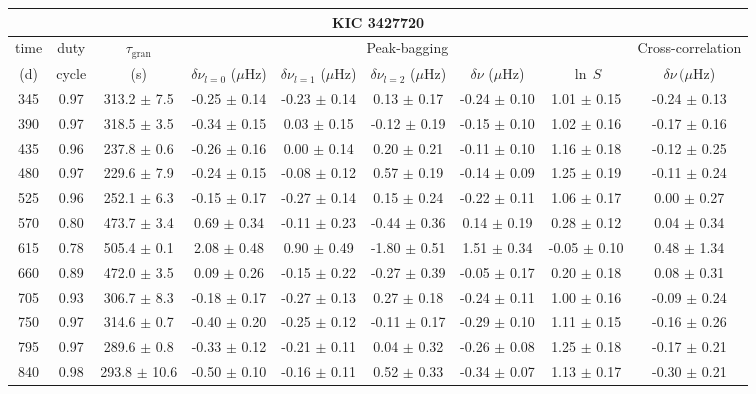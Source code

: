 \documentclass[twocolumn]{aastex61}%
\begin{document}
\begin{table*}[ht]\centering\fontsize{9.}{7.}\selectfont
\begin{tabular}{ccc|ccccc|c}
\multicolumn{9}{c}{KIC 3427720}\\ \hline\hline
time & duty & $\tau_\text{gran}$ &\multicolumn{5}{c|}{Peak-bagging}&Cross-correlation\\
(d)& cycle & (s)&$\delta\nu_{l=0}$ ($\mu$Hz) & $\delta\nu_{l=1}$ ($\mu$Hz) & $\delta\nu_{l=2}$ ($\mu$Hz) & $\delta\nu$ ($\mu$Hz)& $\ln\,S$ & $\delta\nu\,(\mu$Hz)\\\hline
345 & 0.97 & 313.2 $\pm$ 7.5 & -0.25 $\pm$ 0.14 & -0.23 $\pm$ 0.14 & 0.13 $\pm$ 0.17 & -0.24 $\pm$ 0.10 & 1.01 $\pm$ 0.15 & -0.24 $\pm$ 0.13\\
390 & 0.97 & 318.5 $\pm$ 3.5 & -0.34 $\pm$ 0.15 & 0.03 $\pm$ 0.15 & -0.12 $\pm$ 0.19 & -0.15 $\pm$ 0.10 & 1.02 $\pm$ 0.16 & -0.17 $\pm$ 0.16\\
435 & 0.96 & 237.8 $\pm$ 0.6 & -0.26 $\pm$ 0.16 & 0.00 $\pm$ 0.14 & 0.20 $\pm$ 0.21 & -0.11 $\pm$ 0.10 & 1.16 $\pm$ 0.18 & -0.12 $\pm$ 0.25\\
480 & 0.97 & 229.6 $\pm$ 7.9 & -0.24 $\pm$ 0.15 & -0.08 $\pm$ 0.12 & 0.57 $\pm$ 0.19 & -0.14 $\pm$ 0.09 & 1.25 $\pm$ 0.19 & -0.11 $\pm$ 0.24\\
525 & 0.96 & 252.1 $\pm$ 6.3 & -0.15 $\pm$ 0.17 & -0.27 $\pm$ 0.14 & 0.15 $\pm$ 0.24 & -0.22 $\pm$ 0.11 & 1.06 $\pm$ 0.17 & 0.00 $\pm$ 0.27\\
570 & 0.80 & 473.7 $\pm$ 3.4 & 0.69 $\pm$ 0.34 & -0.11 $\pm$ 0.23 & -0.44 $\pm$ 0.36 & 0.14 $\pm$ 0.19 & 0.28 $\pm$ 0.12 & 0.04 $\pm$ 0.34\\
615 & 0.78 & 505.4 $\pm$ 0.1 & 2.08 $\pm$ 0.48 & 0.90 $\pm$ 0.49 & -1.80 $\pm$ 0.51 & 1.51 $\pm$ 0.34 & -0.05 $\pm$ 0.10 & 0.48 $\pm$ 1.34\\
660 & 0.89 & 472.0 $\pm$ 3.5 & 0.09 $\pm$ 0.26 & -0.15 $\pm$ 0.22 & -0.27 $\pm$ 0.39 & -0.05 $\pm$ 0.17 & 0.20 $\pm$ 0.18 & 0.08 $\pm$ 0.31\\
705 & 0.93 & 306.7 $\pm$ 8.3 & -0.18 $\pm$ 0.17 & -0.27 $\pm$ 0.13 & 0.27 $\pm$ 0.18 & -0.24 $\pm$ 0.11 & 1.00 $\pm$ 0.16 & -0.09 $\pm$ 0.24\\
750 & 0.97 & 314.6 $\pm$ 0.7 & -0.40 $\pm$ 0.20 & -0.25 $\pm$ 0.12 & -0.11 $\pm$ 0.17 & -0.29 $\pm$ 0.10 & 1.11 $\pm$ 0.15 & -0.16 $\pm$ 0.26\\
795 & 0.97 & 289.6 $\pm$ 0.8 & -0.33 $\pm$ 0.12 & -0.21 $\pm$ 0.11 & 0.04 $\pm$ 0.32 & -0.26 $\pm$ 0.08 & 1.25 $\pm$ 0.18 & -0.17 $\pm$ 0.21\\
840 & 0.98 & 293.8 $\pm$ 10.6 & -0.50 $\pm$ 0.10 & -0.16 $\pm$ 0.11 & 0.52 $\pm$ 0.33 & -0.34 $\pm$ 0.07 & 1.13 $\pm$ 0.17 & -0.30 $\pm$ 0.21\\

\end{tabular}
\end{table*}
\end{document}
